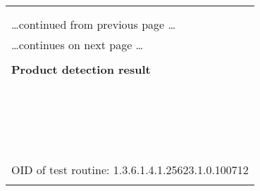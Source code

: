 \documentclass{article}
\begin{document}
\begin{longtable}{|p{}|}
\hline
\rowcolor{openvas_hole}{\color{white}{High (CVSS: 6.4) }}\\
\rowcolor{openvas_hole}{\color{white}{NVT: Apache Tomcat 'Transfer-Encoding' Information Disclosure and Denial Of Service Vulnerabilities}}\\
\hline
\endfirsthead
\hfill\ldots continued from previous page \ldots \\
\hline
\endhead
\hline
\ldots continues on next page \ldots \\
\endfoot
\hline
\endlastfoot
\\
\textbf{Product detection result}\\
\rowcolor{white}{\verb=cpe:/a:apache:tomcat:6.0.24=}\\
\rowcolor{white}{\verb=Detected by Apache Tomcat Version Detection (OID: 1.3.6.1.4.1.25623.1.0.800371)=}\\
\\
\hline
\\
\rowcolor{white}{\verb= Summary:=}\\
\rowcolor{white}{\verb= Apache Tomcat is prone to multiple remote vulnerabilities including=}\\
\rowcolor{white}{\verb=information-disclosure and denial-of-service issues.=}\\
\rowcolor{white}{\verb=Remote attackers can exploit these issues to cause denial-of-service=}\\
\rowcolor{white}{\verb=conditions or gain access to potentially sensitive information;=}\\
\rowcolor{white}{\verb=information obtained may lead to further attacks.=}\\
\rowcolor{white}{\verb=The following versions are affected:=}\\
\rowcolor{white}{\verb=Tomcat 5.5.0 to 5.5.29 Tomcat 6.0.0 to 6.0.27 Tomcat 7.0.0=}\\
\rowcolor{white}{\verb=Tomcat 3.x, 4.x, and 5.0.x may also be affected.=}\\
\rowcolor{white}{\verb= Solution:=}\\
\rowcolor{white}{\verb= The vendor released updates. Please see the references for more=}\\
\rowcolor{white}{\verb=information.=}\\
\rowcolor{white}{\verb==}\\
\rowcolor{white}{\verb==}\\
\\
OID of test routine: 1.3.6.1.4.1.25623.1.0.100712\\
\\


\end{longtable}
\end{document}
